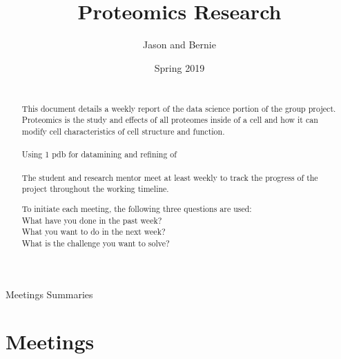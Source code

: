 \documentclass{article}
\title{Proteomics Research}
\author{Jason and Bernie}
\date{Spring 2019}
\newcommand{\xx}[1][]{{ \ifthenelse{\isempty{#1}}{\textcolor{red}{XXX}}{\textcolor{red}{~(XXX {#1} XXX)~}} }}
\newcommand{\newpar}{{\\}}
\begin{document}
\maketitle
\begin{abstract}
\xx \\
This document details a weekly report of the data science portion of the group project. 
Proteomics is the study and effects of all proteomes inside of a cell and how it can modify cell characteristics of cell structure and function.\newpar
\newpar
Using 1 pdb for datamining and refining of \newpar
\newpar
The student and research mentor meet at least weekly to track the progress of the project throughout the working timeline.\newpar

To initiate each meeting, the following three questions are used:\\
What have you done in the past week?\\
What you want to do in the next week?\\
What is the challenge you want to solve?\newpar
\end{abstract} 

\begin{center}
Meetings Summaries
\end{center}

\section*{Meetings}
\end{document}
